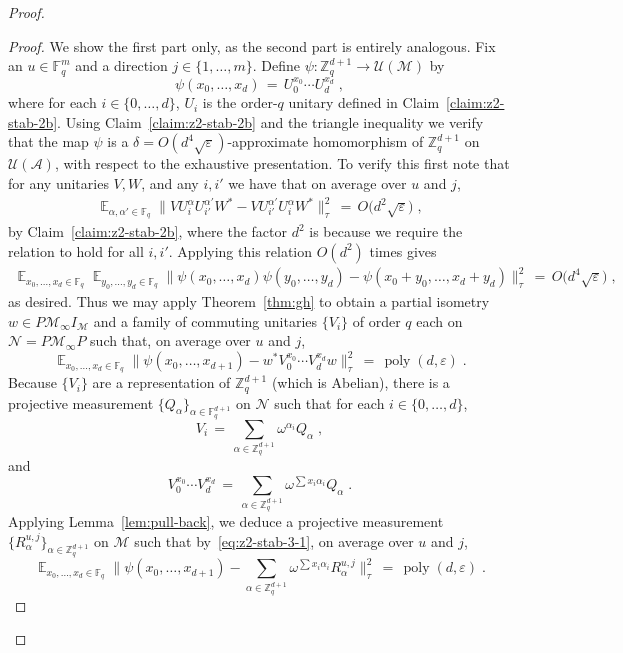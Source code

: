 \documentclass[11pt]{article}
\theoremstyle{definition}
\newcommand{\Id}{\ensuremath{I}}
\DeclareMathOperator*{\Expectation}{\mathbb{E}}
\newcommand{\Es}[1]{\Expectation_{#1}}
\newcommand{\F}{\ensuremath{\mathbb{F}}}
\newcommand{\Z}{\ensuremath{\mathbb{Z}}}
\newcommand{\mA}{\ensuremath{\mathcal{A}}}
\newcommand{\mM}{\ensuremath{\mathcal{M}}}
\newcommand{\mU}{\ensuremath{\mathcal{U}}}
\DeclareMathOperator{\poly}{poly}
\newcommand{\eps}{\varepsilon}
\newcommand{\mN}{\mathcal{N}}
\begin{document}
\begin{proof}
\begin{proof}
We show the first part only, as the second part is entirely analogous. Fix an $u\in \F_q^m$ and a direction $j\in \{1,\ldots,m\}$. Define
$\psi: \Z_q^{d+1} \to \mU(\mM)$ by 
\[\psi(x_0,\ldots,x_{d}) \,=\, U_0^{x_0} \cdots U_{d}^{x_{d}}\;,\]
where for each $i\in\{0,\ldots,d\}$, $U_i$ is the order-$q$ unitary defined in Claim~\ref{claim:z2-stab-2b}. Using Claim~\ref{claim:z2-stab-2b} and the triangle inequality we verify that the map $\psi$ is a $\delta=O(d^4\sqrt{\eps})$-approximate homomorphism of $\Z_q^{d+1}$ on $\mU(\mA)$, with respect to the exhaustive presentation. To verify this first note that for any unitaries $V,W$, and any $i,i'$ we have that on average over $u$ and $j$,
\begin{align*}
\Es{\alpha,\alpha'\in \F_q} \big\| V U_i^\alpha U_{i'}^{\alpha'} W^* - V U_{i'}^{\alpha'} U_i^\alpha  W^*\big\|_\tau^2 \,=\, O\big(d^2 \sqrt{\eps}\big)\;,
\end{align*}
by Claim~\ref{claim:z2-stab-2b}, where the factor $d^2$ is because we require the relation to hold for all $i,i'$. Applying this relation $O(d^2)$ times gives
\begin{align*}
 \Es{x_0,\ldots,x_d\in\F_q}\Es{y_0,\ldots,y_d\in\F_q}\big\|\psi(x_0,\ldots,x_d)\psi(y_0,\ldots,y_d) -\psi(x_0+y_0,\ldots,x_d+y_d)\big\|_\tau^2 \,=\, O\big(d^4 \sqrt{\eps}\big)\;,
\end{align*}
as desired.
Thus we may apply Theorem~\ref{thm:gh} to obtain a partial isometry $w\in P\mM_\infty\Id_\mM$ and a family of commuting unitaries $\{V_i\}$ of order $q$ each on $\mN=P\mM_\infty P$ such that, on average over $u$ and $j$,
\begin{equation}\label{eq:z2-stab-3-1}
\Es{x_0,\ldots,x_{d}\in\F_q} \big\| \psi(x_0,\ldots,x_{d+1}) - w^* V_0^{x_0}\cdots V_{d}^{x_{d}} w \big\|_\tau^2 \,=\, \poly(d,\eps)\;.
\end{equation}
Because $\{V_i\}$ are a representation of $\Z_q^{d+1}$ (which is Abelian), there is a projective measurement $\{Q_\alpha\}_{\alpha\in \F_q^{d+1}}$ on $\mN$ such that for each $i\in\{0,\ldots,d\}$, 
\[ V_i \,=\, \sum_{\alpha\in \Z_q^{d+1}} \omega^{\alpha_i} Q_\alpha\;,\]
and  
\[ V_0^{x_0}\cdots V_{d}^{x_{d}}  \,=\, \sum_{\alpha\in \Z_q^{d+1}} \omega^{\sum x_i\alpha_i} Q_\alpha\;.\]
Applying Lemma~\ref{lem:pull-back}, we deduce a projective measurement $\{R^{u,j}_\alpha\}_{\alpha\in \Z_q^{d+1}}$  on $\mM$ such that by~\eqref{eq:z2-stab-3-1}, on average over $u$ and $j$,
\[  \Es{x_0,\ldots,x_{d}\in\F_q} \Big\| \psi(x_0,\ldots,x_{d+1}) -  \sum_{\alpha\in \Z_q^{d+1}} \omega^{\sum x_i\alpha_i} R_\alpha^{u,j}\Big\|_\tau^2 \,=\, \poly(d,\eps)\;.\]
\end{proof}




\end{proof}
\end{document}
